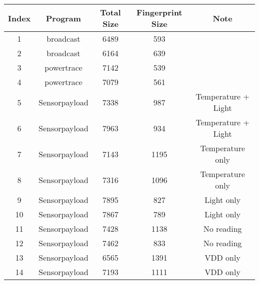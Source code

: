 \begin{table}[!ht]
\center
\begin{tabular}{|c|c|c|c|c|}
\hline
\textbf{Index} & \textbf{Program} & \textbf{Total Size} & \textbf{Fingerprint Size} & \textbf{Note}              \\ \hline
1                    & broadcast            & 6489          & 593                    &                            \\ \hline
2                    & broadcast            & 6164          & 639                    &                            \\ \hline
3                    & powertrace           & 7142          & 539                    &                            \\ \hline
4                    & powertrace           & 7079          & 561                    &                            \\ \hline
5                    & Sensorpayload        & 7338          & 987                    & Temperature + Light        \\ \hline
6                    & Sensorpayload        & 7963          & 934                    & Temperature + Light        \\ \hline
7                    & Sensorpayload        & 7143          & 1195                   & Temperature only           \\ \hline
8                    & Sensorpayload        & 7316          & 1096                   & Temperature only           \\ \hline
9                    & Sensorpayload        & 7895          & 827                    & Light only                 \\ \hline
10                   & Sensorpayload        & 7867          & 789                    & Light only                 \\ \hline
11                   & Sensorpayload        & 7428          & 1138                   & No reading                 \\ \hline
12                   & Sensorpayload        & 7462          & 833                    & No reading                 \\ \hline
13                   & Sensorpayload        & 6565          & 1391                   & VDD only                   \\ \hline
14                   & Sensorpayload        & 7193          & 1111                   & VDD only                   \\ \hline

\end{tabular}
\end{table}
